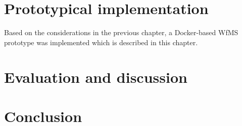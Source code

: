 \documentclass[language=english,noinputenc]{wiwwuwordrprt}
\begin{document}
      


  \chapter{Prototypical implementation} %
    \label{cha:implementation}
    Based on the considerations in the previous chapter, a Docker-based \ac{WfMS} prototype was implemented  which is described in this chapter.
    

  \chapter{Evaluation and discussion} %
    \label{cha:evaluation}
    

  \chapter{Conclusion} %
    \label{cha:conclusion}
    

  
  

  \appendix
  



\end{document}
